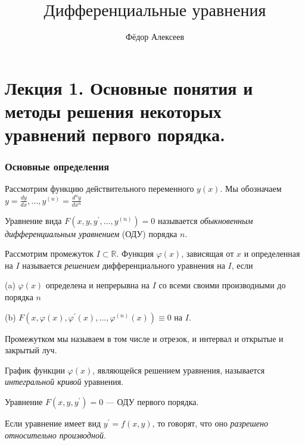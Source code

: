 



\title{$\mbox{Дифференциальные уравнения}$}
\author{Фёдор Алексеев}

\maketitle\gitlink\tableofcontents

\part*{Лекция 1. Основные понятия и методы решения некоторых уравнений первого
порядка.}

\section{Основные определения}
\begin{remark*}
Рассмотрим функцию действительного переменного $y(x)$. Мы обозначаем
$y=\frac{dy}{dx},\ldots,y^{(n)}=\frac{d^{n}y}{dx^{n}}$\end{remark*}
\begin{define*}
Уравнение вида $F(x,y,y^{\prime},\ldots,y^{(n)})=0$ называется \emph{обыкновенным
дифференциальным уравнением} (ОДУ) порядка $n$.
\end{define*}

\begin{define*}
Рассмотрим промежуток $I\subset\mathbb{R}$. Функция $\varphi(x)$,
зависящая от $x$ и определенная на $I$ называется \emph{решением}
дифференциального уравнения на $I$, если

(a) $\varphi(x)$ определена и непрерывна на $I$ со всеми своими
производными до порядка $n$

(b) $F(x,\varphi(x),\varphi^{\prime}(x),\ldots,\varphi^{(n)}(x))\equiv0$
на $I$.\end{define*}
\begin{remark*}
Промежутком мы называем в том числе и отрезок, и интервал и открытые
и закрытый луч.
\end{remark*}

\begin{define*}
График функции $\varphi(x)$, являющейся решением уравнения, называется
\emph{интегральной кривой} уравнения.
\end{define*}

\begin{remark*}
Уравнение $F(x,y,y^{\prime})=0$ --- ОДУ первого порядка.\end{remark*}
\begin{define*}
Если уравнение имеет вид $y^{\prime}=f(x,y)$, то говорят, что оно
\emph{разрешено относительно производной}.
\end{define*}

